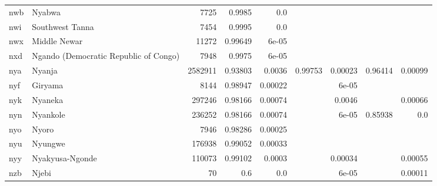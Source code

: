 \documentclass[11pt]{article}
\begin{document}
\begin{table*}[h]
{\begin{tabular}{llrrrrrrr}
nwb         & Nyabwa         & 7725         & 0.9985         & 0.0         &          &          &          &          \\

nwi         & Southwest Tanna         & 7454         & 0.9995         & 0.0         &          &          &          &          \\

nwx         & Middle Newar         & 11272         & 0.99649         & 6e-05         &          &          &          &          \\

nxd         & Ngando (Democratic Republic of Congo)         & 7948         & 0.9975         & 6e-05         &          &          &          &          \\

nya         & Nyanja         & 2582911         & 0.93803         & 0.0036         & 0.99753         & 0.00023         & 0.96414         & 0.00099         \\

nyf         & Giryama         & 8144         & 0.98947         & 0.00022         &          & 6e-05         &          &          \\

nyk         & Nyaneka         & 297246         & 0.98166         & 0.00074         &          & 0.0046         &          & 0.00066         \\

nyn         & Nyankole         & 236252         & 0.98166         & 0.00074         &          & 6e-05         & 0.85938         & 0.0         \\

nyo         & Nyoro         & 7946         & 0.98286         & 0.00025         &          &          &          &          \\

nyu         & Nyungwe         & 176938         & 0.99052         & 0.00033         &          &          &          &          \\

nyy         & Nyakyusa-Ngonde         & 110073         & 0.99102         & 0.0003         &          & 0.00034         &          & 0.00055         \\

nzb         & Njebi         & 70         & 0.6         & 0.0         &          & 6e-05         &          & 0.00011         \\


\end{tabular}}
\end{table*}
\end{document}
